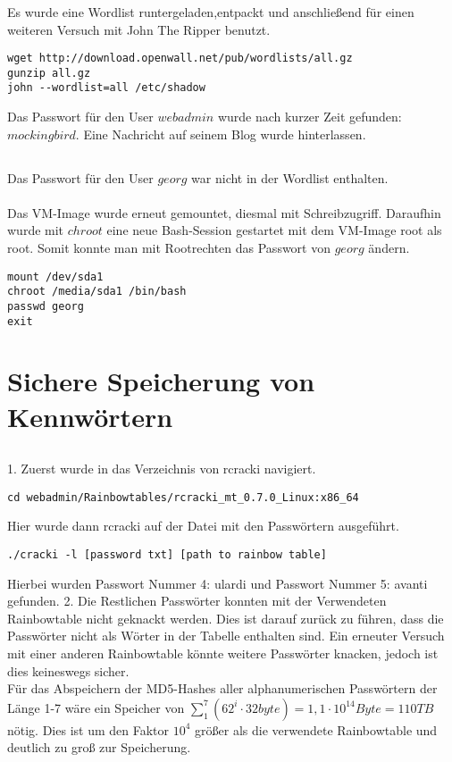 \documentclass[11pt]{article}
\theoremstyle{plain}
\begin{document}
\subsubsection{}
Es wurde eine Wordlist runtergeladen,entpackt und anschließend für einen weiteren Versuch mit John The Ripper benutzt.
\begin{lstlisting}
wget http://download.openwall.net/pub/wordlists/all.gz
gunzip all.gz
john --wordlist=all /etc/shadow
\end{lstlisting}
Das Passwort für den User $webadmin$ wurde nach kurzer Zeit gefunden: $mockingbird$. Eine Nachricht auf seinem Blog wurde hinterlassen.
\subsection{}
Das Passwort für den User $georg$ war nicht in der Wordlist enthalten. \\ \\
Das VM-Image wurde erneut gemountet, diesmal mit Schreibzugriff. Daraufhin wurde mit $chroot$ eine neue Bash-Session gestartet mit dem VM-Image root als root. Somit konnte man mit Rootrechten das Passwort von $georg$ ändern.
\begin{lstlisting}
mount /dev/sda1
chroot /media/sda1 /bin/bash
passwd georg
exit
\end{lstlisting}
\section{Sichere Speicherung von Kennwörtern}
\subsection{}
1.	Zuerst wurde in das Verzeichnis von rcracki navigiert.
\begin{lstlisting}
cd webadmin/Rainbowtables/rcracki_mt_0.7.0_Linux:x86_64
\end{lstlisting}
Hier wurde dann rcracki auf der Datei mit den Passwörtern ausgeführt.
\begin{lstlisting}
./cracki -l [password txt] [path to rainbow table]
\end{lstlisting}
Hierbei wurden Passwort Nummer 4: ulardi und Passwort Nummer 5: avanti gefunden.
2.	Die Restlichen Passwörter konnten mit der Verwendeten Rainbowtable nicht geknackt werden. Dies ist darauf zurück zu führen, dass die Passwörter nicht als Wörter in der Tabelle enthalten sind. Ein erneuter Versuch mit einer anderen Rainbowtable könnte weitere Passwörter knacken, jedoch ist dies keineswegs sicher.\\
Für das Abspeichern der MD5-Hashes aller alphanumerischen Passwörtern der Länge 1-7 wäre ein Speicher von $\sum_1^7 (62^i \cdot 32 byte) = 1,1 \cdot 10^{14} Byte = 110 TB$ nötig. Dies ist um den Faktor $10^4$ größer als die verwendete Rainbowtable und deutlich zu groß zur Speicherung.
\end{document}

